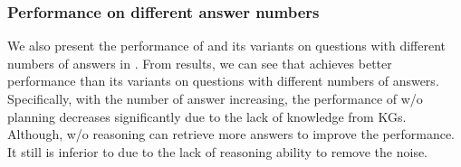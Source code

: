 \subsubsection{Performance on different answer numbers}
We also present the performance of \ourmethod and its variants on questions with different numbers of answers in . From results, we can see that \ourmethod achieves better performance than its variants on questions with different numbers of answers. Specifically, with the number of answer increasing, the performance of \ourmethod w/o planning decreases significantly due to the lack of knowledge from KGs. Although, \ourmethod w/o reasoning can retrieve more answers to improve the performance. It still is inferior to \ourmethod due to the lack of reasoning ability to remove the noise.
\begin{table}[]
    \centering
    \caption{F1 scores of \ourmethod and its variants for questions with varying numbers of answers.}
    \label{tab:exp_number_ans}
\end{table}

